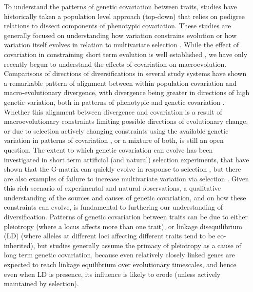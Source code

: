 \begin{refsection}
To understand the patterns of genetic covariation between traits,
studies have historically taken a population level approach (top-down)
that relies on pedigree relations to dissect components of phenotypic
covariation. These studies are generally focused on understanding how
variation constrains evolution or how variation itself evolves in
relation to multivariate selection \parencite{Arnold2008-pc,Futuyma2010-jl}.
While the effect of covariation in constraining short
term evolution is well established \parencite{Lande1979-by,Grant1995-er,Schluter1996-gw}
, we have only recently begun to
understand the effects of covariation on macroevolution. Comparisons of
directions of diversifications in several study systems have shown a
remarkable pattern of alignment between within population covariation
and macro-evolutionary divergence, with divergence being greater in
directions of high genetic variation, both in patterns of phenotypic
\parencite{Marroig2005-ce,Punzalan2016-lb,Simon2016-ed} and genetic
covariation \parencite{Houle2017-ph,McGlothlin2018-hm}. Whether this alignment between
divergence and covariation is a result of macroevolutionary constraints
limiting possible directions of evolutionary change, or due to selection
actively changing constraints using the available genetic variation in
patterns of covariation \parencite{Arnold2001-lz,Pavlicev2011-xm,Pavlicev2015-up,Walter2018-dw},
or a mixture of both, is still an open question. The extent to
which genetic covariation can evolve has been investigated in short term
artificial (and natural) selection experiments, that have shown that the
G-matrix can quickly evolve in response to selection \parencite{Careau2015-sy,Assis2016-vz,Penna2017-if},
but there are also
examples of failure to increase multivariate variation via selection \parencite{Sztepanacz2017-ot}.
Given this rich scenario of experimental and natural observations, a
qualitative understanding of the sources and causes of genetic
covariation, and on how these constraints can evolve, is fundamental to
furthering our understanding of diversification. Patterns of genetic
covariation between traits can be due to either pleiotropy (where a
locus affects more than one trait), or linkage disequilibrium (LD)
(where alleles at different loci affecting different traits tend to be
co-inherited), but studies generally assume the primacy of pleiotropy as
a cause of long term genetic covariation, because even relatively
closely linked genes are expected to reach linkage equilibrium over
evolutionary timescales, and hence even when LD is presence, its
influence is likely to erode (unless actively maintained by selection).


\end{refsection}
